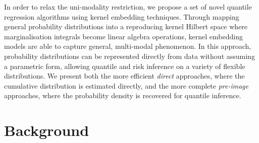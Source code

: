 \documentclass[twoside]{article} \usepackage{aistats2017}
\theoremstyle{definition}
\theoremstyle{theorem}
\begin{document}

	In order to relax the uni-modality restriction, we propose a set of novel quantile regression algorithms using kernel embedding techniques. Through mapping general probability distributions into a reproducing kernel Hilbert space where marginalisation integrals become linear algebra operations, kernel embedding models are able to capture general, multi-modal phenomenon. In this approach, probability distributions can be represented directly from data without assuming a parametric form, allowing quantile and risk inference on a variety of flexible distributions. We present both the more efficient \textit{direct} approaches, where the cumulative distribution is estimated directly, and the more complete \textit{pre-image} approaches, where the probability density is recovered for quantile inference.

% 
% 

	
\section{Background}
\label{sec:background}
	
\end{document}
